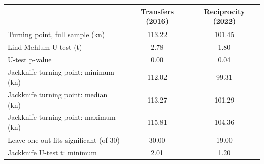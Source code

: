 \begin{tabular}{l*{2}{c}}
\toprule
            &Transfers (2016)&Reciprocity (2022)\\
\midrule
Turning point, full sample (kn)&      113.22&      101.45\\
Lind-Mehlum U-test (t)&        2.78&        1.80\\
U-test p-value&        0.00&        0.04\\
Jackknife turning point: minimum (kn)&      112.02&       99.31\\
Jackknife turning point: median (kn)&      113.27&      101.29\\
Jackknife turning point: maximum (kn)&      115.81&      104.36\\
Leave-one-out fits significant (of 30)&       30.00&       19.00\\
Jackknife U-test t: minimum&        2.01&        1.20\\
\bottomrule
\end{tabular}
